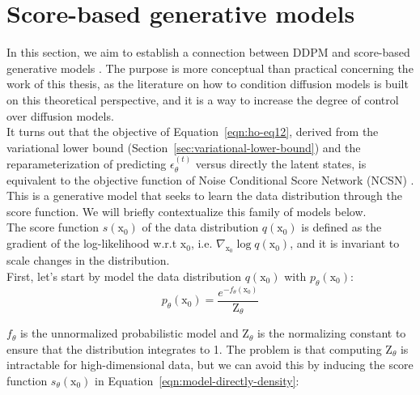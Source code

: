 \section{Score-based generative models}\label{sec:ddpm-as-score}


In this section, we aim to establish a connection between DDPM and score-based generative models \citep{song2020generative, song2020improved, song2021scorebased}. The purpose is more conceptual than practical concerning the work of this thesis, as the literature on how to condition diffusion models is built on this theoretical perspective, and it is a way to increase the degree of control over diffusion models. \\

\noindent It turns out that the objective of Equation~\ref{eqn:ho-eq12}, derived from the variational lower bound (Section~\ref{sec:variational-lower-bound}) and the reparameterization of predicting $\epsilon_{\theta}^{(t)}$ versus directly the latent states, is equivalent to the objective function of Noise Conditional Score Network (NCSN) \citep{song2020improved}. This is a generative model that seeks to learn the data distribution through the score function. We will briefly contextualize this family of models below. \\

\noindent The score function $s(\mathrm{x}_{0})$ of the data distribution $q(\mathrm{x}_{0})$ is defined as the gradient of the log-likelihood w.r.t $\mathrm{x}_{0}$, i.e. $\nabla_{\mathrm{x}_{0}}\log q(\mathrm{x}_{0})$, and it is invariant to scale changes in the distribution. \\

\noindent First, let's start by model the data distribution $q(\mathrm{x}_{0})$ with $p_{\theta}(\mathrm{x}_{0})$:
\begin{equation}\label{eqn:model-directly-density}
    p_{\theta}(\mathrm{x}_{0}) = \frac{e^{-f_{\theta}(\mathrm{x}_{0})}}{\mathrm{Z}_{\theta}} 
\end{equation}

\noindent $f_{\theta}$ is the unnormalized probabilistic model and $\mathrm{Z}_{\theta}$ is the normalizing constant to ensure that the distribution integrates to 1.  The problem is that computing $\mathrm{Z}_{\theta}$ is intractable for high-dimensional data, but we can avoid this by inducing the score function $s_{\theta}(\mathrm{x}_{0})$ in Equation~\ref{eqn:model-directly-density}: \\


